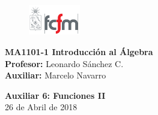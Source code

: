 \documentclass[letterpaper,11pt]{article}
\theoremstyle{plain}
\begin{document}
\newpage
\pagestyle{fancy}
\fancyhf{}

\begin{figure} %
    \vspace{-5mm}
    \includegraphics[width=0.2\textwidth]{img/fcfm2.png}
\end{figure}


\noindent
\textbf{MA1101-1 Introducción al Álgebra}\\
\textbf{Profesor: }Leonardo Sánchez C.\\
\textbf{Auxiliar: }Marcelo Navarro

\begin{center}
{\bf \Large Auxiliar 6: Funciones II}\\
{26 de Abril de 2018}
\end{center}
\end{document}
